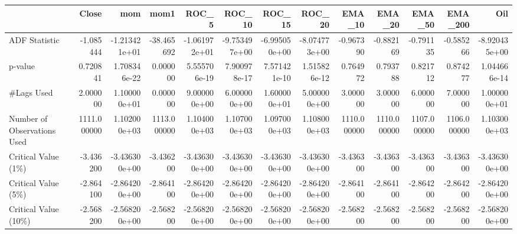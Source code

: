\begin{tabular}{lrrrrrrrrrrrr}
\toprule
{} &        Close &           mom &         mom1 &         ROC\_5 &        ROC\_10 &        ROC\_15 &        ROC\_20 &       EMA\_10 &       EMA\_20 &       EMA\_50 &      EMA\_200 &           Oil \\
\midrule
ADF Statistic               &    -1.085444 & -1.213421e+01 &   -38.465692 & -1.061972e+01 & -9.753497e+00 & -6.995050e+00 & -8.074773e+00 &    -0.967390 &    -0.882169 &    -0.791135 &    -0.585266 & -8.920435e+00 \\
p-value                     &     0.720841 &  1.708346e-22 &     0.000000 &  5.555706e-19 &  7.900978e-17 &  7.571421e-10 &  1.515826e-12 &     0.764972 &     0.793788 &     0.821712 &     0.874277 &  1.044666e-14 \\
\#Lags Used                  &     2.000000 &  1.100000e+01 &     0.000000 &  9.000000e+00 &  6.000000e+00 &  1.600000e+01 &  5.000000e+00 &     3.000000 &     3.000000 &     6.000000 &     7.000000 &  1.000000e+01 \\
Number of Observations Used &  1111.000000 &  1.102000e+03 &  1113.000000 &  1.104000e+03 &  1.107000e+03 &  1.097000e+03 &  1.108000e+03 &  1110.000000 &  1110.000000 &  1107.000000 &  1106.000000 &  1.103000e+03 \\
Critical Value (1\%)         &    -3.436200 & -3.436300e+00 &    -3.436200 & -3.436300e+00 & -3.436300e+00 & -3.436300e+00 & -3.436300e+00 &    -3.436300 &    -3.436300 &    -3.436300 &    -3.436300 & -3.436300e+00 \\
Critical Value (5\%)         &    -2.864100 & -2.864200e+00 &    -2.864100 & -2.864200e+00 & -2.864200e+00 & -2.864200e+00 & -2.864200e+00 &    -2.864100 &    -2.864100 &    -2.864200 &    -2.864200 & -2.864200e+00 \\
Critical Value (10\%)        &    -2.568200 & -2.568200e+00 &    -2.568200 & -2.568200e+00 & -2.568200e+00 & -2.568200e+00 & -2.568200e+00 &    -2.568200 &    -2.568200 &    -2.568200 &    -2.568200 & -2.568200e+00 \\
\bottomrule
\end{tabular}
